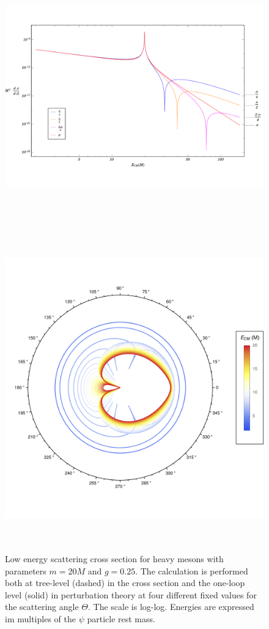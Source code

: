 \documentclass{article}
\begin{document}
\begin{figure}
\begin{center}
\vspace*{-2.5cm}
\includegraphics[width=15cm, height=11cm]{HighMass-UnStableMeson-HighEnergy}
\vspace*{-0.5cm}
\caption{Low energy scattering cross section for heavy mesons with parameters $m = 20 M$ and $g = 0.25$. The calculation is performed both at tree-level (dashed) in the cross section and the one-loop level (solid) in perturbation theory at four different fixed values for the scattering angle $\Theta$. The scale is log-log. Energies are expressed im multiples of the $\psi$ particle rest mass.} 
\label{HighMassUnStabHighEnergy}
\vspace*{-0.5cm}
\includegraphics[width=14cm, height=14cm]{UnStableMeson-LowEnergy-Polar}

\end{center}
\end{figure}
\end{document}
